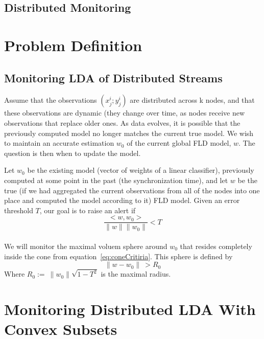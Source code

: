 \documentclass[11pt,twocolumn,varwidth=true,a4paper,fleqn]{article}
\begin{document}
\subsection{Distributed Monitoring}

\section{Problem Definition}
\subsection{Monitoring LDA of Distributed Streams}
Assume that the observations ${(x^i_j; y^i_j)}$ are distributed across k nodes, and that these observations are dynamic (they change over time, as nodes receive new observations that replace older ones. As data evolves, it is possible that the
previously computed model no longer matches the current true model. We wish to maintain an accurate estimation $w_0$ of the current global FLD model, $w$. The question is then when to update the model.

Let $w_0$ be the existing model (vector of weights of a linear classifier), 
previously computed at some point in the past (the synchronization time), 
and let $w$ be the true (if we had aggregated the current observations 
from all of the nodes into one place and computed the model according to it) FLD model. 
Given an error threshold $T$, our goal is to raise an alert if
\begin{equation} \label{eq:coneCritiria}
\frac{<w,w_0>}{\parallel w \parallel \parallel w_0 \parallel}  < T
\end{equation}
\\We will monitor the maximal voluem sphere around $w_0$ that resides completely
inside the cone from equation~\ref{eq:coneCritiria}. This sphere is
defined by
\begin{equation} \label{eq:critiria}
\parallel w-w_0 \parallel \  >  R_0
\end{equation}
Where $R_0 := \  \parallel w_0 \parallel \sqrt{1-T^2}$ is the maximal radius.
\section{Monitoring Distributed LDA With Convex Subsets}
\end{document}
